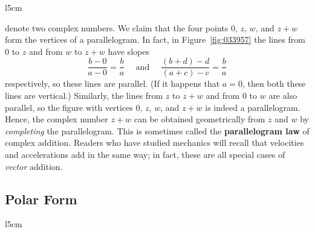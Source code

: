 \begin{wrapfigure}[6]{l}{5cm}
        \vspace*{-5em}
        \vspace*{-4em}
	\centering
	
	\caption{\label{fig:033957}}
\end{wrapfigure}


\noindent denote two complex numbers. We claim that the four points $0$, $z$, $w$, and $z + w$ form the vertices of a parallelogram. In fact, in Figure~\ref{fig:033957} the lines from $0$ to $z$ and from $w$ to $z + w$ have slopes
\begin{equation*}
\frac{b-0}{a-0} = \frac{b}{a} \quad \mbox{ and } \quad \frac{(b+d)-d}{(a+c)-c} = \frac{b}{a}
\end{equation*}
respectively, so these lines are parallel. (If it happens that $a = 0$, then both these lines are vertical.) Similarly, the lines from $z$ to $z + w$ and from $0$ to $w$ are also parallel, so the figure with vertices $0$, $z$, $w$, and $z + w$ is indeed a parallelogram. Hence, the complex number $z + w$ can be obtained geometrically from $z$ and $w$ by \textit{completing} the parallelogram. This is sometimes called the \textbf{parallelogram law}
 of complex addition. Readers who have studied mechanics will recall 
that velocities and accelerations add in the same way; in fact, these 
are all special cases of \textit{vector} addition.

\subsection*{Polar Form}
\begin{wrapfigure}{l}{5cm}
	\centering
	
	\caption{\label{fig:033966}}
\end{wrapfigure}

